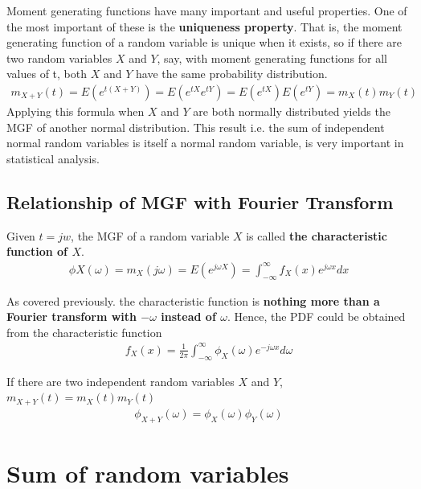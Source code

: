 \documentclass[10pt,a4paper]{article}
\begin{document}
Moment generating functions have many important and useful properties. One of the most important of
these is the \textbf{uniqueness property}. That is, the moment generating function of a random
variable is unique when it exists, so if there are two random variables $X$ and $Y$, say, with
moment generating functions for all values of t, both $X$ and $Y$ have the same probability
distribution. 
\begin{align*}
    m_{X+Y}(t)=E(e^{t(X+Y)}) = E(e^{tX}e^{tY})=E(e^{tX})E(e^{tY}) = m_X(t)m_Y(t)
\end{align*}
Applying this formula when $X$ and $Y$ are both normally distributed yields the MGF of another normal
distribution. This result i.e. the sum of independent normal random variables is itself a normal random
variable, is very important in statistical analysis.

\subsection{Relationship of MGF with Fourier Transform}

Given $t = jw$, the MGF of a random variable $X$ is called \textbf{the characteristic function of
$X$}.
\begin{align*}
    \phi X(\omega) = m_X (j\omega) = E(e^{j\omega X}) = \int^\infty_{-\infty} f_X (x)e^{j\omega x} dx
\end{align*}

As covered previously. the characteristic function is \textbf{nothing more than a Fourier transform
with $-\omega$ instead of $\omega$}. Hence, the PDF could be obtained from the characteristic
function
\begin{align*}
    f_X(x) = \frac{1}{2\pi}\int_{-\infty}^{\infty}\phi_X (\omega)e^{-j\omega x} d\omega
\end{align*}

If there are two independent random variables $X$ and $Y$, $m_{X+Y}(t) = m_X(t)m_Y(t)$
\begin{align*}
    \phi_{X+Y}(\omega) = \phi_X (\omega)\phi_Y (\omega)
\end{align*}

\section{Sum of random variables}
\end{document}
